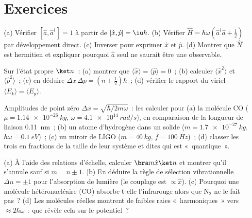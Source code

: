 \section{Exercices}

\begin{exercise}[$\star$]\label{exo:b3:harmonic-oscillator:1}
(a) Vérifier $[\hat a, \hat a^\dagger] = 1$ à partir de $[\hat x, \hat p] =
\iu\hbar$. (b) Vérifier $\hat H = \hbar\omega(\hat a^\dagger\hat a +
\tfrac12)$ par développement direct. (c) Inverser pour exprimer
$\hat x$ et $\hat p$. (d) Montrer que $\hat N$ est hermitien et
expliquer pourquoi $\hat a$ seul ne saurait être une observable.
\end{exercise}

\begin{exercise}[$\star$]\label{exo:b3:harmonic-oscillator:2}
Sur l'état propre $\ket n$~: (a) montrer que $\langle\hat x\rangle =
\langle\hat p\rangle = 0$~; (b) calculer $\langle\hat x^2\rangle$ et
$\langle\hat p^2\rangle$~; (c) en déduire $\Delta x\,\Delta p = (n +
\tfrac12)\hbar$~; (d) vérifier le rapport du viriel $\langle E_k\rangle =
\langle E_p\rangle$.
\end{exercise}

\begin{exercise}[$\star$]\label{exo:b3:harmonic-oscillator:3}
Amplitudes de point zéro $\Delta x = \sqrt{\hbar/2m\omega}$~: les calculer
pour (a) la molécule CO ($\mu = \qty{1.14e-26}{kg}$, $\omega =
\qty{4.1e14}{rad/s}$), en comparaison de la longueur de liaison
\qty{0.11}{nm}~; (b) un atome d'hydrogène dans un solide ($m =
\qty{1.7e-27}{kg}$, $\hbar\omega = \qty{0.1}{eV}$)~; (c) un miroir de
LIGO ($m = \qty{40}{kg}$, $f = \qty{100}{Hz}$)~; (d) classer les trois
en fractions de la taille de leur système et dites qui est
«~quantique~».
\end{exercise}

\begin{exercise}[$\star$]\label{exo:b3:harmonic-oscillator:4}
(a) À l'aide des relations d'échelle, calculer $\bra m\hat x\ket n$ et
montrer qu'il s'annule sauf si $m = n \pm 1$. (b) En déduire la règle
de sélection vibrationnelle $\Delta n = \pm1$ pour l'absorption de
lumière (le couplage est $\propto\hat x$). (c) Pourquoi une molécule
hétéronucléaire (CO) absorbe-t-elle l'infrarouge alors que N$_2$ ne le
fait pas~? (d) Les molécules réelles montrent de faibles raies
«~harmoniques~» vers $\approx 2\hbar\omega$~: que révèle cela sur le
potentiel~?
\end{exercise}

